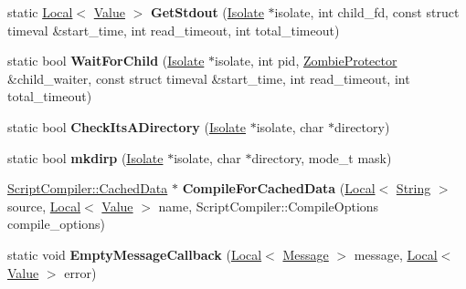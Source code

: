 \begin{DoxyCompactItemize}
\item 
static \hyperlink{classv8_1_1_local}{Local}$<$ \hyperlink{classv8_1_1_value}{Value} $>$ {\bfseries Get\+Stdout} (\hyperlink{classv8_1_1_isolate}{Isolate} $\ast$isolate, int child\+\_\+fd, const struct timeval \&start\+\_\+time, int read\+\_\+timeout, int total\+\_\+timeout)\hypertarget{namespacev8_a12ce53dea96a79624b4e499916c7cfd7}{}\label{namespacev8_a12ce53dea96a79624b4e499916c7cfd7}

\item 
static bool {\bfseries Wait\+For\+Child} (\hyperlink{classv8_1_1_isolate}{Isolate} $\ast$isolate, int pid, \hyperlink{classv8_1_1_zombie_protector}{Zombie\+Protector} \&child\+\_\+waiter, const struct timeval \&start\+\_\+time, int read\+\_\+timeout, int total\+\_\+timeout)\hypertarget{namespacev8_a44ce27a6b18ca4e2d55e0de955daf44f}{}\label{namespacev8_a44ce27a6b18ca4e2d55e0de955daf44f}

\item 
static bool {\bfseries Check\+Its\+A\+Directory} (\hyperlink{classv8_1_1_isolate}{Isolate} $\ast$isolate, char $\ast$directory)\hypertarget{namespacev8_a32d38e01a538ca466901e21e5e4dfdce}{}\label{namespacev8_a32d38e01a538ca466901e21e5e4dfdce}

\item 
static bool {\bfseries mkdirp} (\hyperlink{classv8_1_1_isolate}{Isolate} $\ast$isolate, char $\ast$directory, mode\+\_\+t mask)\hypertarget{namespacev8_a4625fca772049d58458e124e1a4d7a7c}{}\label{namespacev8_a4625fca772049d58458e124e1a4d7a7c}

\item 
\hyperlink{structv8_1_1_script_compiler_1_1_cached_data}{Script\+Compiler\+::\+Cached\+Data} $\ast$ {\bfseries Compile\+For\+Cached\+Data} (\hyperlink{classv8_1_1_local}{Local}$<$ \hyperlink{classv8_1_1_string}{String} $>$ source, \hyperlink{classv8_1_1_local}{Local}$<$ \hyperlink{classv8_1_1_value}{Value} $>$ name, Script\+Compiler\+::\+Compile\+Options compile\+\_\+options)\hypertarget{namespacev8_a809366b1c03e50f0cc96441bf7fb289b}{}\label{namespacev8_a809366b1c03e50f0cc96441bf7fb289b}

\item 
static void {\bfseries Empty\+Message\+Callback} (\hyperlink{classv8_1_1_local}{Local}$<$ \hyperlink{classv8_1_1_message}{Message} $>$ message, \hyperlink{classv8_1_1_local}{Local}$<$ \hyperlink{classv8_1_1_value}{Value} $>$ error)\hypertarget{namespacev8_abfebccaf28a8bb34bdb1737e62549762}{}\label{namespacev8_abfebccaf28a8bb34bdb1737e62549762}


\end{DoxyCompactItemize}
